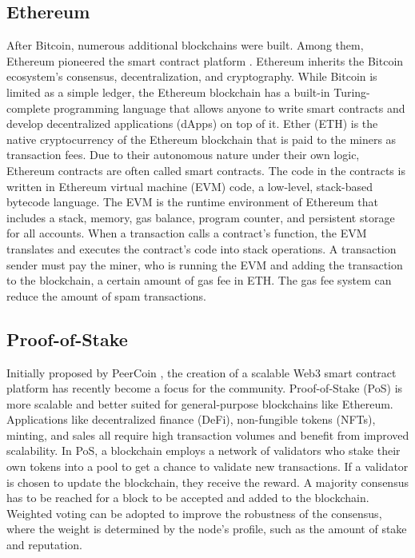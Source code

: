 \documentclass[11pt,letterpaper,twocolumn]{article}
\begin{document}
\subsection{Ethereum}
After Bitcoin, numerous additional blockchains were built. Among them, Ethereum pioneered the smart contract platform \cite{wood2014ethereum}.
Ethereum inherits the Bitcoin ecosystem's consensus, decentralization, and cryptography. While Bitcoin is limited as a simple ledger, the Ethereum blockchain has a built-in Turing-complete programming language that allows anyone to write smart contracts and develop decentralized applications (dApps) on top of it. Ether (ETH) is the native cryptocurrency of the Ethereum blockchain that is paid to the miners as transaction fees. Due to their autonomous nature under their own logic, Ethereum contracts are often called smart contracts. The code in the contracts is written in Ethereum virtual machine (EVM) code, a low-level, stack-based bytecode language. The EVM is the runtime environment of Ethereum that includes a stack, memory, gas balance, program counter, and persistent storage for all accounts. When a transaction calls a contract's function, the EVM translates and executes the contract's code into stack operations. A transaction sender must pay the miner, who is running the EVM and adding the transaction to the blockchain, a certain amount of gas fee in ETH. The gas fee system can reduce the amount of spam transactions.

\subsection{Proof-of-Stake}
Initially proposed by PeerCoin \cite{king2012ppcoin}, the creation of a scalable Web3 smart contract platform has recently become a focus for the community. Proof-of-Stake (PoS) is more scalable and better suited for general-purpose blockchains like Ethereum. Applications like decentralized finance (DeFi), non-fungible tokens (NFTs), minting, and sales all require high transaction volumes and benefit from improved scalability.
In PoS, a blockchain employs a network of validators who stake their own tokens into a pool to get a chance to validate new transactions. If a validator is chosen to update the blockchain, they receive the reward. A majority consensus has to be reached for a block to be accepted and added to the blockchain. Weighted voting can be adopted to improve the robustness of the consensus, where the weight is determined by the node's profile, such as the amount of stake and reputation.
\end{document}
